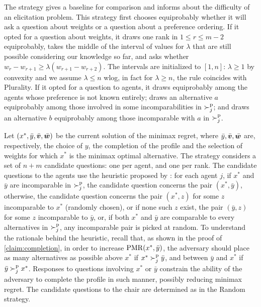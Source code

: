 \documentclass{article}
\begin{document}
The  strategy gives a baseline for comparison and informs about the difficulty of an elicitation problem. 
This strategy first chooses equiprobably whether it will ask a question about weights or a question about a preference ordering. If it opted for a question about weights, it draws one rank in $1 ≤ r ≤ m-2$ equiprobably, takes the middle of the interval of values for $\lambda$ that are still possible considering our knowledge so far, and asks whether $w_r - w_{r+1} ≥ \lambda (w_{r+1} - w_{r+2})$. The intervals are initialized to $[1, n]$: $\lambda≥1$ by convexity and we assume $\lambda≤n$ wlog, in fact for $\lambda≥n$, the rule coincides with Plurality. If it opted for a question to agents, it draws equiprobably among the agents whose preference is not known entirely; draws an alternative $a$ equiprobably among those involved in some incomparabilities in $\succ^\text{p}_j$; and draws an alternative $b$ equiprobably among those incomparable with $a$ in $\succ^\text{p}_j$.

Let $(x^{*},\bar{y}, \bar{\bm{v}}, \bar{\bm{w}})$ be the current solution of the minimax regret, where $\bar{y}, \bar{\bm{v}}, \bar{\bm{w}}$ are, respectively, the choice of $y$, the completion of the profile and the selection of weights for which $x^{*}$ is the minimax optimal alternative. 
The  strategy considers a set of $n + m$ candidate questions: one per agent, and one per rank.
The candidate questions to the agents use the heuristic proposed by \citet{Lu2011}: for each agent $j$, if $x^*$ and $\bar{y}$ are incomparable in $\succ^\text{p}_j$, the candidate question concerns the pair $(x^*, \bar{y})$, otherwise, the candidate question concerns the pair $(x^*, z)$ for some $z$ incomparable to $x^*$ (randomly chosen), or if none such $z$ exist, the pair $(\bar{y}, z)$ for some $z$ incomparable to $\bar{y}$, or, if both $x^*$ and $\bar{y}$ are comparable to every alternatives in $\succ^\text{p}_j$, any incomparable pair is picked at random. 
To understand the rationale behind the heuristic, 
recall that, as shown in the proof of \cref{claim:completion}, in order to increase $\operatorname{PMR}(x^{*},\bar{y})$, the adversary should place as many alternatives as possible above $x^{*}$ if $x^* \succ^\text{p}_j \bar{y}$, and between $\bar{y}$ and $x^{*}$ if $\bar{y} \succ^\text{p}_j x^*$.  
Responses to questions involving $x^*$ or $\bar{y}$ constrain the ability of the adversary to complete the profile in such manner, possibly reducing minimax regret.
The candidate questions to the chair are determined as in the Random strategy.
\end{document}
